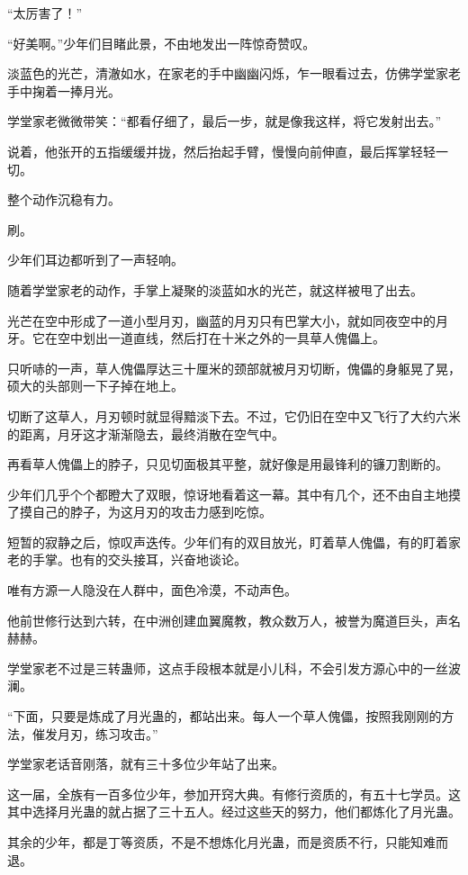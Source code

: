 \begin{this_body}
“太厉害了！”

“好美啊。”少年们目睹此景，不由地发出一阵惊奇赞叹。

淡蓝色的光芒，清澈如水，在家老的手中幽幽闪烁，乍一眼看过去，仿佛学堂家老手中掬着一捧月光。

学堂家老微微带笑：“都看仔细了，最后一步，就是像我这样，将它发射出去。”

说着，他张开的五指缓缓并拢，然后抬起手臂，慢慢向前伸直，最后挥掌轻轻一切。

整个动作沉稳有力。

刷。

少年们耳边都听到了一声轻响。

随着学堂家老的动作，手掌上凝聚的淡蓝如水的光芒，就这样被甩了出去。

光芒在空中形成了一道小型月刃，幽蓝的月刃只有巴掌大小，就如同夜空中的月牙。它在空中划出一道直线，然后打在十米之外的一具草人傀儡上。

只听哧的一声，草人傀儡厚达三十厘米的颈部就被月刃切断，傀儡的身躯晃了晃，硕大的头部则一下子掉在地上。

切断了这草人，月刃顿时就显得黯淡下去。不过，它仍旧在空中又飞行了大约六米的距离，月牙这才渐渐隐去，最终消散在空气中。

再看草人傀儡上的脖子，只见切面极其平整，就好像是用最锋利的镰刀割断的。

少年们几乎个个都瞪大了双眼，惊讶地看着这一幕。其中有几个，还不由自主地摸了摸自己的脖子，为这月刃的攻击力感到吃惊。

短暂的寂静之后，惊叹声迭传。少年们有的双目放光，盯着草人傀儡，有的盯着家老的手掌。也有的交头接耳，兴奋地谈论。

唯有方源一人隐没在人群中，面色冷漠，不动声色。

他前世修行达到六转，在中洲创建血翼魔教，教众数万人，被誉为魔道巨头，声名赫赫。

学堂家老不过是三转蛊师，这点手段根本就是小儿科，不会引发方源心中的一丝波澜。

“下面，只要是炼成了月光蛊的，都站出来。每人一个草人傀儡，按照我刚刚的方法，催发月刃，练习攻击。”

学堂家老话音刚落，就有三十多位少年站了出来。

这一届，全族有一百多位少年，参加开窍大典。有修行资质的，有五十七学员。这其中选择月光蛊的就占据了三十五人。经过这些天的努力，他们都炼化了月光蛊。

其余的少年，都是丁等资质，不是不想炼化月光蛊，而是资质不行，只能知难而退。


\end{this_body}
